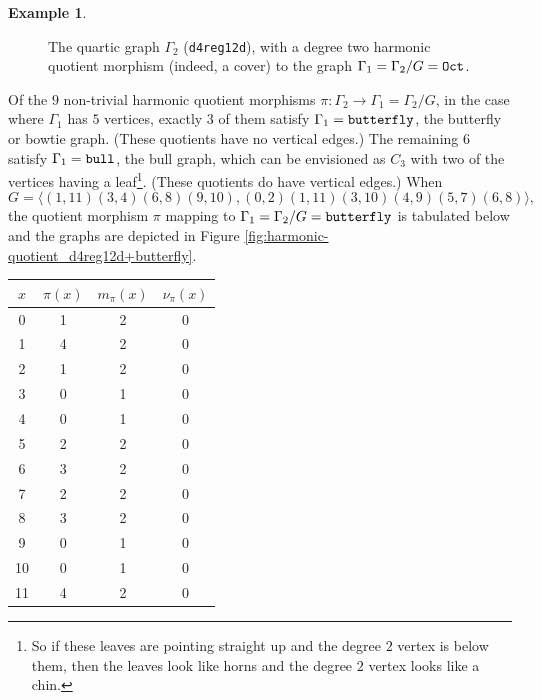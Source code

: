 \documentclass[12pt,letterpaper]{article}
\theoremstyle{definition}
\newtheorem{example}[theorem]{Example}
\begin{document}
\begin{example}
{\begin{figure}[H]
\begin{minipage}{\textwidth}
\begin{center}
%
\end{center}
\end{minipage}
\caption{The quartic graph $\Gamma_2$ ({\tt d4reg12d}), with a degree two harmonic quotient morphism (indeed, a cover) to the graph $\Gamma_1=\Gamma_2/G={\tt Oct}$.}
\label{fig:harmonic-quotient_d4reg12d+octahedral}
\end{figure}

Of the $9$ non-trivial harmonic quotient morphisms
$\pi: \Gamma_2\to \Gamma_1=\Gamma_2/G$, in the case where
$\Gamma_1$ has $5$ vertices, exactly $3$ of them
satisfy $\Gamma_1={\tt butterfly}$, the butterfly or bowtie graph.
(These quotients have no vertical edges.)
The remaining $6$ satisfy $\Gamma_1={\tt bull}$, the bull graph,
which can be envisioned as $C_3$ with two of the vertices having a
leaf\footnote{So if these leaves are pointing straight up
  and the degree $2$ vertex is below them, then the leaves look like
  horns and the degree $2$ vertex looks like a chin.}.
(These quotients do have vertical edges.)
When
\[
G = \langle (1,11)(3,4)(6,8)(9,10), (0,2)(1,11)(3,10)(4,9)(5,7)(6,8) \rangle ,
\]
the quotient morphism $\pi$ mapping to
$\Gamma_1=\Gamma_2/G ={\tt butterfly}$
is tabulated below
and the graphs are depicted in
Figure \ref{fig:harmonic-quotient_d4reg12d+butterfly}. 

\begin{center}
\begin{tabular}{c|c|c|c}  
  $x$ & $\pi(x)$ & $m_\pi(x)$ & $\nu_\pi(x)$   \\ \hline
  0   &    1   &        2         &  0   \\
  1   &    4   &        2         &  0   \\
  2   &    1   &        2         &  0   \\
  3   &    0   &        1         &  0   \\
  4   &    0   &        1         &  0   \\
  5   &    2   &        2         &  0   \\
  6   &    3   &        2         &  0   \\
  7   &    2   &        2         &  0   \\
  8   &    3   &        2         &  0   \\
  9   &    0   &        1         &  0   \\
  10   &    0   &        1         &  0   \\
  11   &    4   &        2         &  0   \\
\end{tabular}
\end{center}

}
\end{example}
\end{document}
